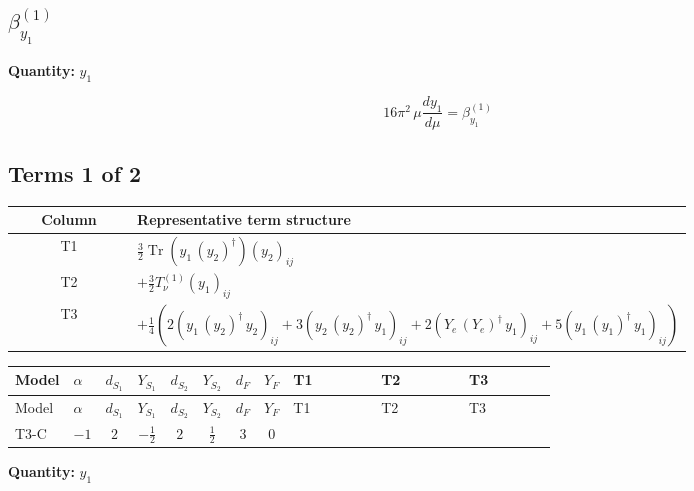 \documentclass[8pt]{article}
\begin{document}
\begin{landscape}
\section*{$\beta_{y_1}^{(1)}$}
\noindent\textbf{Quantity: }$y_1$\par\smallskip
\[16\pi^2\,\mu\frac{d y_1}{d\mu}=\beta_{y_1}^{(1)}\]
\subsection*{Terms 1 of 2}
\begin{center}
\begin{tabular}{@{}c >{\raggedright\arraybackslash}p{0.82\linewidth}@{}}
\toprule
Column & Representative term structure \\
\midrule
T1 & \(\displaystyle \frac{3}{2} \operatorname{Tr}\!\left({y_1}\,\left({y_2}\right)^{\dagger}\right) \left({y_2}\right)_{ij}\) \\
\midrule
T2 & \(\displaystyle +\frac{3}{2} T_{\nu}^{(1)} \left({y_1}\right)_{ij}\) \\
\midrule
T3 & \(\displaystyle +\frac{1}{4} (2 \left({y_1}\,\left({y_2}\right)^{\dagger}\,{y_2}\right)_{ij}+3 \left({y_2}\,\left({y_2}\right)^{\dagger}\,{y_1}\right)_{ij}+2 \left({Y_e}\,\left({Y_e}\right)^{\dagger}\,{y_1}\right)_{ij}+5 \left({y_1}\,\left({y_1}\right)^{\dagger}\,{y_1}\right)_{ij})\) \\
\midrule
\bottomrule
\end{tabular}
\end{center}
\smallskip
\tiny
\begin{longtable}{@{}llcccccc >{\raggedright\arraybackslash}p{0.21\linewidth} >{\raggedright\arraybackslash}p{0.21\linewidth} >{\raggedright\arraybackslash}p{0.21\linewidth}@{}}
\toprule
Model & $\alpha$ & $d_{S_1}$ & $Y_{S_1}$ & $d_{S_2}$ & $Y_{S_2}$ & $d_F$ & $Y_F$ & T1 & T2 & T3 \\
\midrule
\endfirsthead
\toprule
Model & $\alpha$ & $d_{S_1}$ & $Y_{S_1}$ & $d_{S_2}$ & $Y_{S_2}$ & $d_F$ & $Y_F$ & T1 & T2 & T3 \\
\midrule
\endhead
T3-C & $-1$ & $2$ & $-\frac{1}{2}$ & $2$ & $\frac{1}{2}$ & $3$ & $0$ & \scriptsize\adjustbox{max width=\linewidth}{$\begin{gathered} \frac{3}{2} \operatorname{Tr}\!\left({y_1}\,\left({y_2}\right)^{\dagger}\right) \left({y_2}\right)_{ij}\end{gathered}$} & \scriptsize\adjustbox{max width=\linewidth}{$\begin{gathered} +\frac{3}{2} T_{\nu}^{(1)} \left({y_1}\right)_{ij}\end{gathered}$} & \scriptsize\adjustbox{max width=\linewidth}{$\begin{gathered} +\frac{1}{4} (2 \left({y_1}\,\left({y_2}\right)^{\dagger}\,{y_2}\right)_{ij}+3 \left({y_2}\,\left({y_2}\right)^{\dagger}\,{y_1}\right)_{ij}+2 \left({Y_e}\,\left({Y_e}\right)^{\dagger}\,{y_1}\right)_{ij}+5 \left({y_1}\,\left({y_1}\right)^{\dagger}\,{y_1}\right)_{ij})\end{gathered}$} \\
\midrule
\bottomrule
\end{longtable}
\clearpage
\noindent\textbf{Quantity: }$y_1$\par\smallskip

\end{landscape}
\end{document}
